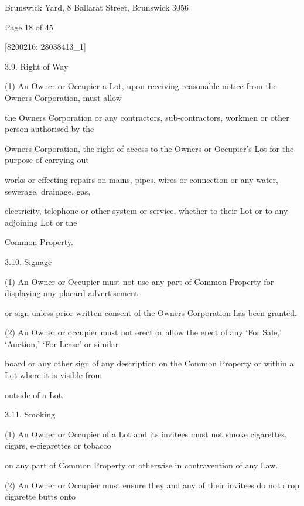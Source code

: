 \documentclass{article}
\begin{document}
{\fontsize{9}{1}Brunswick Yard, 8 Ballarat Street, Brunswick 3056 }


{\fontsize{9}{1}Page 18  of 45 }



{\fontsize{7.02}{1}[8200216: 28038413\_1] }


{\fontsize{9.99}{1}3.9. Right of Way }

{\fontsize{9.962}{1}(1) An Owner or Occupier a Lot, upon receiving reasonable notice from the Owners Corporation, must allow }

{\fontsize{10.02}{1}the Owners Corporation or any contractors, sub-contractors, workmen or other person authorised by the }

{\fontsize{10.02}{1}Owners Corporation, the right of access to the Owners or Occupier’s Lot for the purpose of carrying out }

{\fontsize{10.02}{1}works or effecting repairs on mains, pipes, wires or connection or any water, sewerage, drainage, gas, }

{\fontsize{10.02}{1}electricity, telephone or other system or service, whether to their Lot or to any adjoining Lot or the }

{\fontsize{10.02}{1}Common Property. }

{\fontsize{9.99}{1}3.10. Signage }

{\fontsize{9.962}{1}(1) An Owner or Occupier must not use any part of Common Property for displaying any placard advertisement }

{\fontsize{10.02}{1}or sign unless prior written consent of the Owners Corporation has been granted. }

{\fontsize{9.962}{1}(2) An Owner or occupier must not erect or allow the erect of any ‘For Sale,’ ‘Auction,’ ‘For Lease’ or similar }

{\fontsize{10.02}{1}board or any other sign of any description on the Common Property or within a Lot where it is visible from }

{\fontsize{10.02}{1}outside of a Lot. }

{\fontsize{9.99}{1}3.11. Smoking }

{\fontsize{9.962}{1}(1) An Owner or Occupier of a Lot and its invitees must not smoke cigarettes, cigars, e-cigarettes or tobacco }

{\fontsize{10.02}{1}on any part of Common Property or otherwise in contravention of any Law. }

{\fontsize{9.962}{1}(2) An Owner or Occupier must ensure they and any of their invitees do not drop cigarette butts onto }
\end{document}
